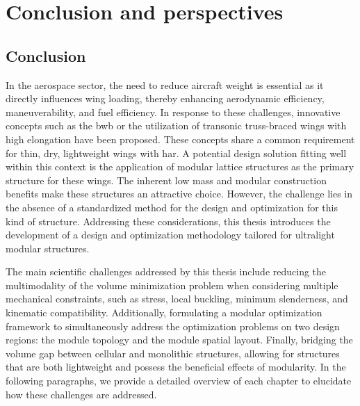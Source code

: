 \setchapterpreamble[u]{\margintoc}
\glsresetall %

\chapter*{Conclusion and perspectives}
{}
%

\section*{Conclusion}
In the aerospace sector, the need to reduce aircraft weight is essential as it directly influences wing loading, thereby enhancing aerodynamic efficiency, maneuverability, and fuel efficiency. In response to these challenges, innovative concepts such as the \gls{bwb} or the utilization of transonic truss-braced wings with high elongation have been proposed. These concepts share a common requirement for thin, dry, lightweight wings with \gls{har}. A potential design solution fitting well within this context is the application of modular lattice structures as the primary structure for these wings. The inherent low mass and modular construction benefits make these structures an attractive choice. However, the challenge lies in the absence of a standardized method for the design and optimization for this kind of structure. Addressing these considerations, this thesis introduces the development of a design and optimization methodology tailored for ultralight modular structures.

The main scientific challenges addressed by this thesis include reducing the multimodality of the volume minimization problem when considering multiple mechanical constraints, such as stress, local buckling, minimum slenderness, and kinematic compatibility. Additionally, formulating a modular optimization framework to simultaneously address the optimization problems on two design regions: the module topology and the module spatial layout. Finally, bridging the volume gap between cellular and monolithic structures, allowing for structures that are both lightweight and possess the beneficial effects of modularity. In the following paragraphs, we provide a detailed overview of each chapter to elucidate how these challenges are addressed.
 

